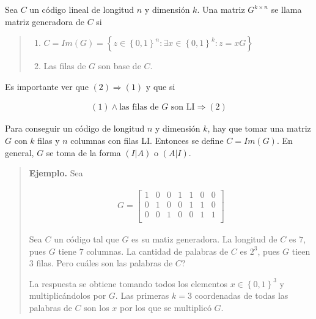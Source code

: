 \documentclass[a4paper]{article}
\begin{document}
\begin{definition}
    Sea $C$ un código lineal de longitud $n$ y dimensión $k$.
    Una matriz $G^{k \times n}$ se llama matriz generadora de $C$ si 

    
    \small
    \begin{quote}
    
    \begin{enumerate}
        \item $C= Im(G) = \left\{ z \in \left\{ 0, 1 \right\}^n : \exists x \in \left\{ 0, 1 \right\}^k : z = xG   \right\} $
        \item Las filas de $G$ son base de $C$.
    \end{enumerate}
    
    \end{quote}
    \normalsize
    
\end{definition}

Es importante ver que $(2) \Rightarrow (1)$ y que si 

\begin{align*}
    (1) \land  \text{las filas de $G$ son LI} \Rightarrow (2)
\end{align*}

Para conseguir un código de longitud $n$ y dimensión $k$, hay que tomar una
matriz $G$ con $k$ filas y $n$ columnas con filas LI. Entonces se define
$C = Im(G)$. En general, $G$ se toma de la forma $(I|A)$ o $(A | I)$.


\small
\begin{quote}

\textbf{Ejemplo.} Sea 

\begin{align*}
    G = \begin{bmatrix} 
        1 & 0 & 0 & 1 & 1 & 0 & 0 \\ 
        0 & 1 & 0 & 0 & 1 & 1 & 0 \\ 
        0 & 0 & 1 & 0 & 0 & 1 & 1 \\ 
    \end{bmatrix} 
\end{align*}

Sea $C$ un código tal que $G$ es su matiz generadora. La longitud de $C$ es $7$,
pues $G$ tiene $7$ columnas. La cantidad de palabras de $C$ es $2^3$, pues
$G$ tieen $3$ filas. Pero cuáles son las palabras de $C$?

La respuesta se obtiene tomando todos los elementos $x \in \left\{ 0, 1
\right\}^3 $ y multiplicándolos por $G$. Las primeras $k=3$ coordenadas 
de todas las palabras de $C$ son los $x$ por los que se multiplicó 
$G$. 



\end{quote}
\normalsize
\end{document}
